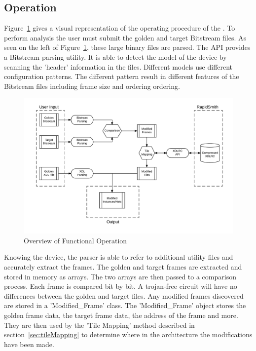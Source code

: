 \subsection{Operation} \label{sec:operation}
Figure~\ref{fig:Operation} gives a visual representation of the operating procedure of the \Name.
To perform analysis the user must submit the \gls{golden} and \gls{target} \gls{Bitstream} files.
As seen on the left of Figure~\ref{fig:Operation}, these large binary files are parsed. 
The \RapidSmith \acrshort{API} provides a \gls{Bitstream} parsing utility.
It is able to detect the model of the device by scanning the 'header' information in the files.
Different \Xilinx models use different configuration patterns.
The different pattern result in different features of the \gls{Bitstream} files including frame size and ordering ordering. 
\begin{figure}[h]
	\centering
	\includegraphics[width=1\linewidth]{Figures/Operation}
	\caption[Overview of Functional Operation]{Overview of Functional Operation}
	\label{fig:Operation}
\end{figure}
Knowing the device, the parser is able to refer to additional utility files and accurately extract the frames.
The \gls{golden} and \gls{target} frames are extracted and stored in memory as arrays.
The two arrays are then passed to a comparison process.
Each frame is compared bit by bit.
A trojan-free circuit will have no differences between the \gls{golden} and \gls{target} files.
Any modified frames discovered are stored in a 'Modified\_Frame' class.
The 'Modified\_Frame' object stores the \gls{golden} frame data, the \gls{target} frame data, the address of the frame and more.
They are then used by the 'Tile Mapping' method described in section~\ref{sec:tileMapping} to determine where in the architecture the modifications have been made.

